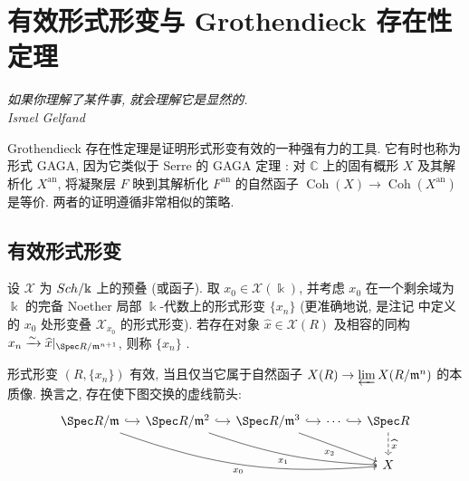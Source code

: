 \section{有效形式形变与 Grothendieck 存在性定理}\label{src:C.5}
\begin{flushright}\itshape
如果你理解了某件事, 就会理解它是显然的.\\
\normalfont Israel Gelfand
\end{flushright}
Grothendieck 存在性定理是证明形式形变有效的一种强有力的工具. 它有时也称为形式 GAGA, 因为它类似于 Serre 的 GAGA 定理 \cite{Ser56}: 对 $\mathbb C$ 上的固有概形 $X$ 及其解析化 $X^{\mathrm{an}}$, 将凝聚层 $F$ 映到其解析化 $F^{\mathrm{an}}$ 的自然函子 $\operatorname{Coh}(X)\to\operatorname{Coh}(X^{\mathrm{an}})$ 是等价. 两者的证明遵循非常相似的策略.

\subsection{有效形式形变}\label{src:C.5.1-subsection}
\begin{definition}\label{src:C.5.1}
设 $\mathcal X$ 为 $\Sch/\Bbbk$ 上的预叠 (或函子). 取 $x_0\in\mathcal X(\Bbbk)$, 并考虑 $x_0$ 在一个剩余域为 $\Bbbk$ 的完备 Noether 局部 $\Bbbk$-代数上的形式形变 $\{x_n\}$ (更准确地说, 是注记  中定义的 $x_0$ 处形变叠 $\mathcal X_{x_0}$ 的形式形变). 若存在对象 $\widehat x\in\mathcal X(R)$ 及相容的同构 $x_n\xrightarrow\sim\widehat x|_{\Spec R/\mathfrak m^{n+1}}$, 则称 $\{x_n\}$ .
\end{definition}
形式形变 $(R,\{x_n\})$ 有效, 当且仅当它属于自然函子 $\mathcal X(R)\to\varprojlim\mathcal X(R/\mathfrak m^n)$ 的本质像. 换言之, 存在使下图交换的虚线箭头:
\[
\begin{tikzcd}[column sep=small]
\Spec R/\mathfrak m\arrow[r,hook]\arrow[drrrr,bend right=12,"x_0"'] & \Spec R/\mathfrak m^2\arrow[r,hook]\arrow[drrr,bend right=8,"x_1"'] & \Spec R/\mathfrak m^3\arrow[r,hook]\arrow[drr,"x_2"'] & \cdots\arrow[r,hook] & \Spec R\arrow[d,dashed,"\widehat x"]\\
&&&&\mathcal X
\end{tikzcd}
\]
